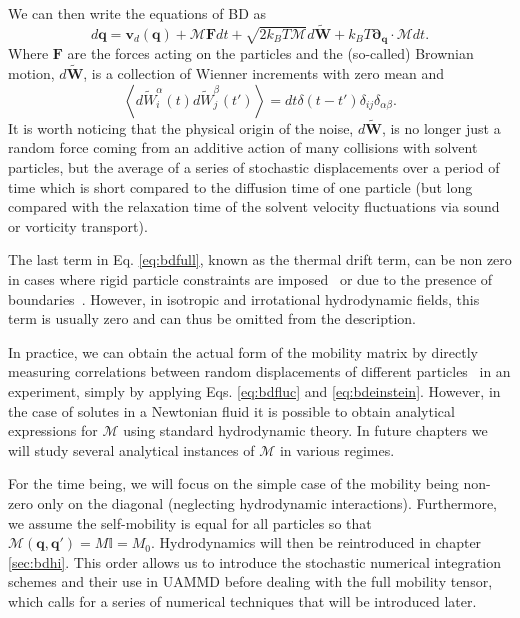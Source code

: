 \documentclass[ twoside,openright,titlepage,numbers=noenddot,%
headinclude,footinclude,cleardoublepage=empty,abstract=on,
BCOR=5mm,paper=b5,fontsize=11pt, dvipsnames
]{scrreprt}
\renewcommand{\vec}[1]{\bm{#1}}
\newcommand{\tens}[1]{\bm{\mathcal{#1}}}
\newcommand{\uammd}{\gls{UAMMD}\xspace}
\newcommand{\kT}{k_B T}
\newcommand{\noise}{\widetilde{W}}
\newcommand{\ppos}{q}
\begin{document}
We can then write the equations of \gls{BD} as
\begin{equation}
  \label{eq:bdfull}
  d\vec{\ppos} = \vec{v}_d(\vec{\ppos}) + \tens{M}\vec{F}dt + \sqrt{2\kT\tens{M}}d\vec{\noise} + \kT\vec{\partial}_{\vec{\ppos}}\cdot\tens{M}dt.
\end{equation}
Where $\vec{F}$ are the forces acting on the particles and the (so-called) Brownian motion, $d\vec{\noise}$, is a collection of Wienner increments with zero mean and
\begin{equation}
\left\langle d\noise_{i}^\alpha(t)d\noise_{j}^\beta(t') \right\rangle = dt\delta(t-t')\delta_{ij}\delta_{\alpha\beta}.
\end{equation}
It is worth noticing that the physical origin of the noise, $d\vec{\noise}$, is no longer just a random force coming from an additive action of many collisions with solvent particles, but the average of a series of stochastic displacements over a period of time which is short compared to the diffusion time of one particle (but long compared with the relaxation time of the solvent velocity fluctuations via sound or vorticity transport).

The last term in Eq. \eqref{eq:bdfull}, known as the thermal drift term, can be non zero in cases where rigid particle constraints are imposed~\cite{Westwood2021} or due to the presence of boundaries~\cite{Pelaez2018,Balboa2016}. However, in isotropic and irrotational hydrodynamic fields, this term is usually zero and can thus be omitted from the description.

In practice, we can obtain the actual form of the mobility matrix by directly measuring correlations between random displacements of different particles~\cite{Panzuela2018} in an experiment, simply by applying Eqs. \eqref{eq:bdfluc} and \eqref{eq:bdeinstein}. However, in the case of solutes in a Newtonian fluid it is possible to obtain analytical expressions for $\tens{M}$ using standard hydrodynamic theory. In future chapters we will study several analytical instances of $\tens{M}$ in various regimes.

For the time being, we will focus on the simple case of the mobility being non-zero only on the diagonal (neglecting hydrodynamic interactions). Furthermore, we assume the self-mobility is equal for all particles so that $\tens{M}(\vec{\ppos}, \vec{\ppos}') = M\mathbb{I} = M_0$. Hydrodynamics will then be reintroduced in chapter \ref{sec:bdhi}. This order allows us to introduce the stochastic numerical integration schemes and their use in \uammd before dealing with the full mobility tensor, which calls for a series of numerical techniques that will be introduced later.
\end{document}
